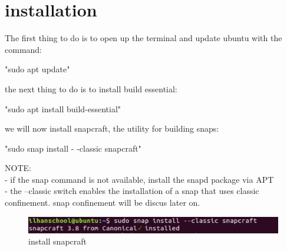 \documentclass{article}
\begin{document}
\newpage%
%
%
%
%
%
%
\section{installation}\label{sec:installation}	%
The first thing to do is to open up the terminal and update ubuntu with the command:\\
\begin{flushleft}	
	\begin{center}	
	"sudo apt update"\\ 
	\end{center}
	
\begin{flushleft}	
the next thing to do is to install build essential:\\ 
\end{flushleft}		

 	\begin{center}	
	"sudo apt install build-essential"\\
	\end{center}

\begin{flushleft}	
we will now install snapcraft, the utility for building snaps:\\
\end{flushleft}		
	
	\begin{center}	
	"sudo snap install   - -classic snapcraft"\\ 
	\end{center}

\begin{flushleft}		
NOTE:\\
- if the snap command is not available, install the snapd%
 package via APT\\
 
- the --classic switch enables the installation of a snap that uses classic confinement. snap confinement will be discus later on.
\label{fig:step1}
	\begin{figure}[H]
	\includegraphics[width=5in]{step1.png}

	\caption[Optional caption]{install snapcraft}
	\end{figure}
\end{flushleft}		
\cleardoublepage
%
%
%
%
%

\end{flushleft}
\end{document}
